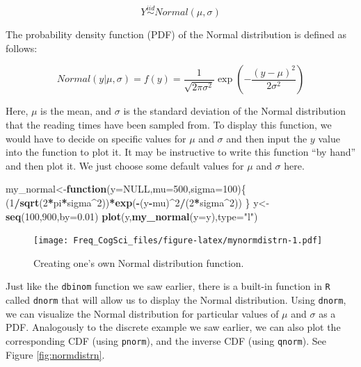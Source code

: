 \documentclass[12pt,]{krantz}
\newenvironment{Shaded}{\begin{snugshade}}{\end{snugshade}}
\newcommand{\ControlFlowTok}[1]{\textcolor[rgb]{0.13,0.29,0.53}{\textbf{#1}}}
\newcommand{\DataTypeTok}[1]{\textcolor[rgb]{0.13,0.29,0.53}{#1}}
\newcommand{\DecValTok}[1]{\textcolor[rgb]{0.00,0.00,0.81}{#1}}
\newcommand{\FloatTok}[1]{\textcolor[rgb]{0.00,0.00,0.81}{#1}}
\newcommand{\KeywordTok}[1]{\textcolor[rgb]{0.13,0.29,0.53}{\textbf{#1}}}
\newcommand{\NormalTok}[1]{#1}
\newcommand{\OperatorTok}[1]{\textcolor[rgb]{0.81,0.36,0.00}{\textbf{#1}}}
\newcommand{\OtherTok}[1]{\textcolor[rgb]{0.56,0.35,0.01}{#1}}
\newcommand{\StringTok}[1]{\textcolor[rgb]{0.31,0.60,0.02}{#1}}
\begin{document}
\begin{equation}
Y \stackrel{iid}{\sim}  Normal(\mu,\sigma)
\end{equation}

The probability density function (PDF) of the Normal distribution is defined as follows:

\begin{equation}
Normal(y|\mu,\sigma)=f(y)= \frac{1}{\sqrt{2\pi \sigma^2}} \exp \left(-\frac{(y-\mu)^2}{2\sigma^2} \right)
\end{equation}

Here, \(\mu\) is the mean, and \(\sigma\) is the standard deviation of the Normal distribution that the reading times have been sampled from. To display this function, we would have to decide on specific values for \(\mu\) and \(\sigma\) and then input the \(y\) value into the function to plot it. It may be instructive to write this function ``by hand'' and then plot it. We just choose some default values for \(\mu\) and \(\sigma\) here.

\begin{Shaded}
\begin{Highlighting}[]
\NormalTok{my_normal<-}\ControlFlowTok{function}\NormalTok{(}\DataTypeTok{y=}\OtherTok{NULL}\NormalTok{,}\DataTypeTok{mu=}\DecValTok{500}\NormalTok{,}\DataTypeTok{sigma=}\DecValTok{100}\NormalTok{)\{}
\NormalTok{  (}\DecValTok{1}\OperatorTok{/}\KeywordTok{sqrt}\NormalTok{(}\DecValTok{2}\OperatorTok{*}\NormalTok{pi}\OperatorTok{*}\NormalTok{sigma}\OperatorTok{^}\DecValTok{2}\NormalTok{))}\OperatorTok{*}\KeywordTok{exp}\NormalTok{(}\OperatorTok{-}\NormalTok{(y}\OperatorTok{-}\NormalTok{mu)}\OperatorTok{^}\DecValTok{2}\OperatorTok{/}\NormalTok{(}\DecValTok{2}\OperatorTok{*}\NormalTok{sigma}\OperatorTok{^}\DecValTok{2}\NormalTok{))}
\NormalTok{\}}
\NormalTok{y<-}\KeywordTok{seq}\NormalTok{(}\DecValTok{100}\NormalTok{,}\DecValTok{900}\NormalTok{,}\DataTypeTok{by=}\FloatTok{0.01}\NormalTok{)}
\KeywordTok{plot}\NormalTok{(y,}\KeywordTok{my_normal}\NormalTok{(}\DataTypeTok{y=}\NormalTok{y),}\DataTypeTok{type=}\StringTok{"l"}\NormalTok{)}
\end{Highlighting}
\end{Shaded}

\begin{figure}
\centering
\texttt{[image: Freq\_CogSci\_files/figure-latex/mynormdistrn-1.pdf]}
\caption{\label{fig:mynormdistrn}Creating one's own Normal distribution function.}
\end{figure}

Just like the \texttt{dbinom} function we saw earlier, there is a built-in function in \texttt{R} called \texttt{dnorm} that will allow us to display the Normal distribution.
Using \texttt{dnorm}, we can visualize the Normal distribution for particular values of \(\mu\) and \(\sigma\) as a PDF. Analogously to the discrete example we saw earlier, we can also plot the corresponding CDF (using \texttt{pnorm}), and the inverse CDF (using \texttt{qnorm}). See Figure \ref{fig:normdistrn}.
\end{document}
